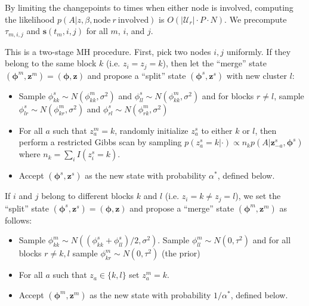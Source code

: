 \documentclass{article}
\begin{document}
 By limiting the changepoints to times when either node is involved, computing the likelihood $p(A|z,\beta,\mbox{node} \ r \ \mbox{involved})$ is $O(|\mathcal{U}_r| \cdot P \cdot N)$.  We precompute $\tau_{m,i,j}$ and $\mathbf{s}(t_m,i,j)$ for all $m$, $i$, and $j$. 


This is a two-stage MH procedure.  First, pick two nodes $i,j$ uniformly.  If they belong to the same block $k$ (i.e. $z_i=z_j=k$), then let the ``merge'' state $(\boldsymbol{\phi}^{m},\mathbf{z}^{m}) = (\boldsymbol{\phi},\mathbf{z})$ and propose a ``split'' state $(\boldsymbol{\phi}^{s},\mathbf{z}^{s})$ with new cluster $l$:
\begin{itemize}
\item Sample $\phi_{kk}^{s} \sim N(\phi_{kk}^{m},\sigma^2)$ and $\phi_{ll}^{s} \sim N(\phi_{kk}^{m},\sigma^2)$ and for blocks $r \ne l$, sample $\phi_{lr}^{s} \sim N(\phi_{kr}^{m},\sigma^2)$ and $\phi_{rl}^{s} \sim N(\phi_{rk}^{m},\sigma^2)$ 
\item For all $a$ such that $z_a^{m} = k$, randomly initialize $z_a^{s}$ to either $k$ or $l$, then perform a restricted Gibbs scan by sampling $p(z_{a}^{s}=k|\cdot)  \propto n_k p(A|\mathbf{z}^{s}_{-a},\boldsymbol{\phi}^{s})$
where $n_k=\sum_{i}I(z_i^{s}=k)$.%
\item Accept  $(\boldsymbol{\phi}^{s},\mathbf{z}^{s})$ as the new state with probability $\alpha^*$, defined below.
\end{itemize}

 If $i$ and $j$ belong to different blocks $k$ and $l$ (i.e. $z_i = k \ne z_j=l$), we set the ``split'' state  $(\boldsymbol{\phi}^{s},\mathbf{z}^{s}) = (\boldsymbol{\phi},\mathbf{z})$ and propose a ``merge'' state $(\boldsymbol{\phi}^{m},\mathbf{z}^{m})$ as follows:
\begin{itemize}
\item Sample $\phi_{kk}^m \sim N((\phi_{kk}^s + \phi_{ll}^s)/2,
  \sigma^2)$.  Sample $\phi_{ll}^m \sim N(0,\tau^2)$ and for all blocks $r \ne k,l$ sample $\phi_{kr}^{m} \sim N(0,\tau^2)$ (the prior)
\item For all $a$ such that $z_a \in \{k,l\}$ set $z_a^m = k$.
\item Accept $(\boldsymbol{\phi}^{m},\mathbf{z}^{m})$ as the new state with probability $1/\alpha^*$, defined below.
\end{itemize}
\end{document}
